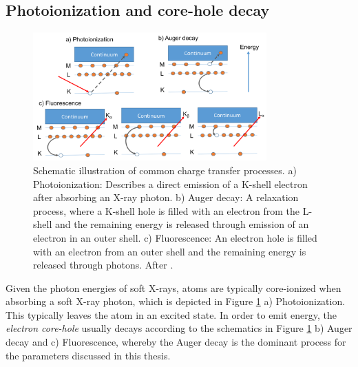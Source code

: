 \subsection{Photoionization and core-hole decay}\label{sec:absorption}
%
\begin{figure}
	\centering
		\includegraphics[width=0.80\textwidth]{images/el-relaxation.png}
	\caption[Schematic illustration of common charge transfer processes]{Schematic illustration of common charge transfer processes. a) Photoionization: Describes a direct emission of a K-shell electron after absorbing an X-ray photon. b) Auger decay: A relaxation process, where a K-shell hole is filled with an electron from the L-shell and the remaining energy is released through emission of an electron in an outer shell. c) Fluorescence: An electron hole is filled with an electron from an outer shell and the remaining energy is released through photons. After \citep{Als-Nielson-2011-JWS}.}
	\label{fig:el-relaxation}
\end{figure}
%
Given the photon energies of soft X-rays, atoms are typically core-ionized when absorbing a soft X-ray photon, which is depicted in Figure \ref{fig:el-relaxation} a) Photoionization. This typically leaves the atom in an excited state. In order to emit energy, the \textit{electron core-hole} usually decays according to the schematics in Figure \ref{fig:el-relaxation} b) Auger decay and c) Fluorescence, whereby the Auger decay is the dominant process for the parameters discussed in this thesis.\\[1\baselineskip]
%
%
%
